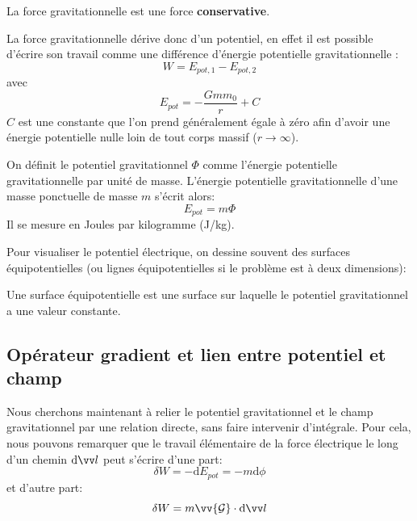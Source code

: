 \documentclass[11pt,fleqn]{book} %
\begin{document}
\begin{proposition}
    La force gravitationnelle est une force \textbf{conservative}.
\end{proposition}

La force gravitationnelle dérive donc d'un potentiel, en effet il est possible d'écrire son travail comme une différence d'énergie potentielle gravitationnelle :
\begin{equation}
    W = E_{pot, 1} - E_{pot,2}
\end{equation}
avec
\begin{equation}
    E_{pot} = -\frac{G m m_0}{r} + C
\end{equation}
$C$ est une constante que l'on prend généralement égale à zéro afin d'avoir une énergie potentielle nulle loin de tout corps massif ($r \to \infty$).

\begin{definition}
    On définit le potentiel gravitationnel $\Phi$ comme l'énergie potentielle gravitationnelle par unité de masse. L'énergie potentielle gravitationnelle d'une masse ponctuelle de masse $m$ s'écrit alors:
    \begin{equation}
        E_{pot} = m \Phi
    \end{equation}
    Il se mesure en Joules par kilogramme (J/kg).
\end{definition}

Pour visualiser le potentiel électrique, on dessine souvent des surfaces équipotentielles (ou lignes équipotentielles si le problème est à deux dimensions):
\begin{definition}
    Une surface équipotentielle est une surface sur laquelle le potentiel gravitationnel a une valeur constante.
\end{definition}

\subsection{Opérateur gradient et lien entre potentiel et champ}

Nous cherchons maintenant à relier le potentiel gravitationnel et le champ gravitationnel par une relation directe, sans faire intervenir d'intégrale. Pour cela, nous pouvons remarquer que le travail élémentaire de la force électrique le long d'un chemin $\mathrm{d} \vv l$ peut s'écrire d'une part:
\begin{equation}
    \delta W = -\mathrm{d}E_{pot} = - m \mathrm{d} \phi
\end{equation}
et d'autre part:
\begin{equation}
    \delta W = m \vv{\mathcal{G}} \cdot \mathrm{d} \vv l
\end{equation}
\end{document}
